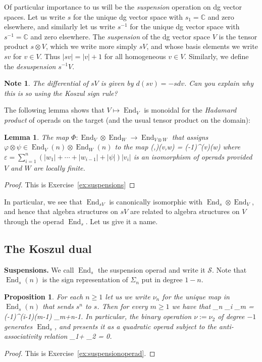 \documentclass[fleqn, a4paper, twoside]{article}
\makeatletter
\newcommand{\0}{\langle 0\rangle}
\newcommand{\End}{\operatorname{End}}
\let\[\@undefined
\DeclareRobustCommand{\[}{\begin{equation}}%
\let\]\@undefined
\DeclareRobustCommand{\]}{\end{equation}}%
\theoremstyle{mytheorem}
\newtheorem{proposition}[theorem]{Proposition}
\newtheorem{lemma}[theorem]{Lemma}
\theoremstyle{introthm}
\theoremstyle{mydefinition}
\newtheorem{note}[theorem]{Note}
\theoremstyle{mydefinition2}
\theoremstyle{plain} %
\newcommand{\?}{\,?\,}
\theoremstyle{mytheorem}
\theoremstyle{plain} %
\makeatother
\begin{document}
Of particular importance to us will be the \emph{suspension}
operation on dg vector spaces. Let us write $s$ for the
unique dg vector space with $s_1 = \mathbb C$ and zero
elsewhere, and similarly let us write $s^{-1}$ for the
unique dg vector space with $s^{-1} = \mathbb{C}$
and zero elsewhere. The \emph{suspension} of the dg vector
space $V$ is the tensor product $s\otimes V$, which
we write more simply $sV$, and whose basis elements we
write $sv$ for $v\in V$. Thus $|sv| = |v|+1$ for all 
homogeneous $v\in V$. Similarly, we define the
\emph{desuspension} $s^{-1}V$.

\begin{note}
The differential of $sV$ is given by $d(sv) = -s dv$. Can you explain why this is so using
the Koszul sign rule?
\end{note}
 
The following lemma shows that $V\mapsto \End_V$ is 
monoidal for the \emph{Hadamard product} of operads on the
target (and the usual tensor product on the domain): 
 \begin{lemma}\label{lemma:hadamard}
The map $\Phi : \End_V\otimes \End_W\longrightarrow \End_{V\otimes W}$
that assigns $\varphi \otimes \psi \in \End_V(n)\otimes \End_W(n)$
to the map
\[ \Phi(\varphi,\psi)(v,w) = (-1)^\varepsilon \varphi(v)\otimes\psi(w)\]
where $\varepsilon = \sum_{i=1}^n (|w_1| +\cdots + |w_{i-1}|+|\psi|)|v_i|$
is an isomorphism of operads provided $V$ and $W$
are locally finite.
 \end{lemma}
 
 \begin{proof}
 This is Exercise~\ref{ex:suspensions}
 \end{proof}

In particular, we see that $\End_{sV}$ is canonically isomorphic
with $\End_s\otimes \End_V$, and hence that algebra structures on $sV$
are related to algebra structures on $V$ through the operad $\End_s$.
Let us give it a name. 

\subsection{The Koszul dual}

\newcommand{\sus}{\mathscr{S}}
\textbf{Suspensions.} 
We call $\End_{s}$ the suspension operad
and write it $\sus$. Note that $\End_{s}(n)$ is
the sign representation of $\Sigma_n$ put in degree $1-n$.

\begin{proposition} For each $n\geqslant 1$ let us
we write $\nu_n$ for the unique map in $\End_s(n)$ 
that sends $s^n$ to $s$. Then for every $m\geqslant 1$
we have that
\[ \nu_n \circ_i \nu_m = (-1)^{(i-1)(m-1)} \nu_{m+n-1}. \]
In particular, the binary operation $\nu := \nu_2$ of degree
$-1$ generates $\End_s$,
and presents it as a quadratic operad subject to the 
anti-associativity relation
\[ \nu \circ_1\nu + \nu\circ_2 \nu = 0.\]
\end{proposition}
\begin{proof}
 This is Exercise~\ref{ex:suspensionoperad}.
\end{proof}
\end{document}
